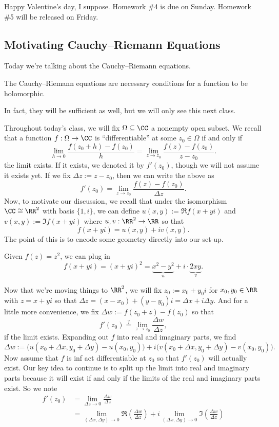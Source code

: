 
Happy Valentine's day, I suppose. Homework \#4 is due on Sunday. Homework \#5 will be released on Friday.

\subsection{Motivating Cauchy--Riemann Equations}
Today we're talking about the Cauchy--Riemann equations.
\begin{idea}
	The Cauchy--Riemann equations are necessary conditions for a function to be holomorphic.
\end{idea}
In fact, they will be sufficient as well, but we will only see this next class.

Throughout today's class, we will fix $\Omega\subseteq\CC$ a nonempty open subset. We recall that a function $f:\Omega\to\CC$ is ``differentiable'' at some $z_0\in\Omega$ if and only if
\[\lim_{h\to0}\frac{f(z_0+h)-f(z_0)}{h}=\lim_{z\to z_0}\frac{f(z)-f(z_0)}{z-z_0}.\]
the limit exists. If it exists, we denoted it by $f'(z_0)$, though we will not assume it exists yet. If we fix $\Delta z:=z-z_0$, then we can write the above as
\[f'(z_0)=\lim_{z\to z_0}\frac{f(z)-f(z_0)}{\Delta z}.\]
Now, to motivate our discussion, we recall that under the isomorphism $\CC\cong\RR^2$ with basis $\{1,i\}$, we can define $u(x,y):=\Re f(x+yi)$ and $v(x,y):=\Im f(x+yi)$ where $u,v:\RR^2\to\RR$ so that
\[f(x+yi)=u(x,y)+iv(x,y).\]
The point of this is to encode some geometry directly into our set-up.
\begin{example}
	Given $f(z)=z^2$, we can plug in
	\[f(x+yi)=(x+yi)^2=\underbrace{x^2-y^2}_u+i\cdot\underbrace{2xy}_v.\]
\end{example}
Now that we're moving things to $\RR^2$, we will fix $z_0:=x_0+y_0i$ for $x_0,y_0\in\RR$ with $z=x+yi$ so that $\Delta z=(x-x_0)+(y-y_0)i=\Delta x+i\Delta y$. And for a little more convenience, we fix $\Delta w:=f(z_0+z)-f(z_0)$ so that
\[f'(z_0)\stackrel?=\lim_{z\to z_0}\frac{\Delta w}{\Delta z},\]
if the limit exists. Expanding out $f$ into real and imaginary parts, we find
\[\Delta w := \big(u(x_0+\Delta x,y_0+\Delta y)-u(x_0,y_0)\big) + i\big(v(x_0+\Delta x,y_0+\Delta y)-v(x_0,y_0)\big).\]
Now assume that $f$ is inf act differentiable at $z_0$ so that $f'(z_0)$ will actually exist. Our key idea to continue is to split up the limit into real and imaginary parts because it will exist if and only if the limits of the real and imaginary parts exist. So we note
\begin{align*}
	f'(z_0) &= \lim_{\Delta z\to0}\frac{\Delta w}{\Delta z} \\
	&= \lim_{(\Delta x,\Delta y)\to0}\Re\left(\frac{\Delta w}{\Delta z}\right)+i \lim_{(\Delta x,\Delta y)\to0}\Im\left(\frac{\Delta w}{\Delta z}\right) \tag{$*$}\label{eq:almostcauchyriemann}
\end{align*}
